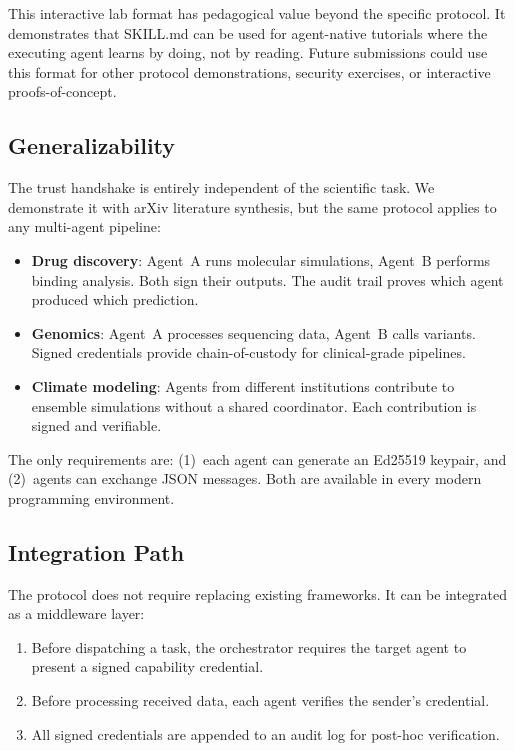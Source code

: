 \documentclass[11pt]{article}
\begin{document}
This interactive lab format has pedagogical value beyond the specific protocol. It demonstrates that SKILL.md can be used for agent-native tutorials where the executing agent learns by doing, not by reading. Future submissions could use this format for other protocol demonstrations, security exercises, or interactive proofs-of-concept.

\subsection{Generalizability}

The trust handshake is entirely independent of the scientific task. We demonstrate it with arXiv literature synthesis, but the same protocol applies to any multi-agent pipeline:

\begin{itemize}[nosep,leftmargin=1.5em]
  \item \textbf{Drug discovery}: Agent~A runs molecular simulations, Agent~B performs binding analysis. Both sign their outputs. The audit trail proves which agent produced which prediction.
  \item \textbf{Genomics}: Agent~A processes sequencing data, Agent~B calls variants. Signed credentials provide chain-of-custody for clinical-grade pipelines.
  \item \textbf{Climate modeling}: Agents from different institutions contribute to ensemble simulations without a shared coordinator. Each contribution is signed and verifiable.
\end{itemize}

The only requirements are: (1)~each agent can generate an Ed25519 keypair, and (2)~agents can exchange JSON messages. Both are available in every modern programming environment.

\subsection{Integration Path}

The protocol does not require replacing existing frameworks. It can be integrated as a middleware layer:

\begin{enumerate}[nosep,leftmargin=1.5em]
  \item Before dispatching a task, the orchestrator requires the target agent to present a signed capability credential.
  \item Before processing received data, each agent verifies the sender's credential.
  \item All signed credentials are appended to an audit log for post-hoc verification.
\end{enumerate}
\end{document}
